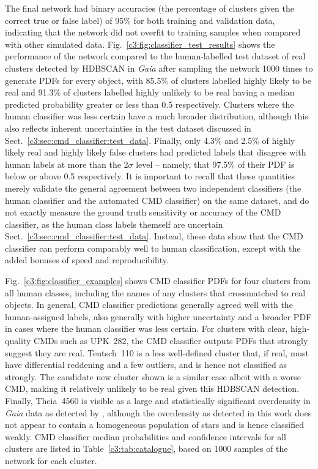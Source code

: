 The final network had binary accuracies (the percentage of clusters given the correct true or false label) of 95\% for both training and validation data, indicating that the network did not overfit to training samples when compared with other simulated data. Fig.~\ref{c3:fig:classifier_test_results} shows the performance of the network compared to the human-labelled test dataset of real clusters detected by HDBSCAN in \emph{Gaia} after sampling the network 1000 times to generate PDFs for every object, with 85.5\% of clusters labelled highly likely to be real and 91.3\% of clusters labelled highly unlikely to be real having a median predicted probability greater or less than 0.5 respectively. Clusters where the human classifier was less certain have a much broader distribution, although this also reflects inherent uncertainties in the test dataset discussed in Sect.~\ref{c3:sec:cmd_classifier:test_data}. Finally, only 4.3\% and 2.5\% of highly likely real and highly likely false clusters had predicted labels that disagree with human labels at more than the 2$\sigma$ level -- namely, that 97.5\% of their PDF is below or above 0.5 respectively. It is important to recall that these quantities merely validate the general agreement between two independent classifiers (the human classifier and the automated CMD classifier) on the same dataset, and do not exactly measure the ground truth sensitivity or accuracy of the CMD classifier, as the human class labels themself are uncertain Sect.~\ref{c3:sec:cmd_classifier:test_data}. Instead, these data show that the CMD classifier can perform comparably well to human classification, except with the added bonuses of speed and reproducibility.

Fig.~\ref{c3:fig:classifier_examples} shows CMD classifier PDFs for four clusters from all human classes, including the names of any clusters that crossmatched to real objects. In general, CMD classifier predictions generally agreed well with the human-assigned labels, also generally with higher uncertainty and a broader PDF in cases where the human classifier was less certain. For clusters with clear, high-quality CMDs such as UPK~282, the CMD classifier outputs PDFs that strongly suggest they are real. Teutsch~110 is a less well-defined cluster that, if real, must have differential reddening and a few outliers, and is hence not classified as strongly. The candidate new cluster shown is a similar case albeit with a worse CMD, making it relatively unlikely to be real given this HDBSCAN detection. Finally, Theia~4560 is visible as a large and statistically significant overdensity in \emph{Gaia} data as detected by \cite{kounkel_untangling_2020}, although the overdensity as detected in this work does not appear to contain a homogeneous population of stars and is hence classified weakly. CMD classifier median probabilities and confidence intervals for all clusters are listed in Table~\ref{c3:tab:catalogue}, based on 1000 samples of the network for each cluster.

